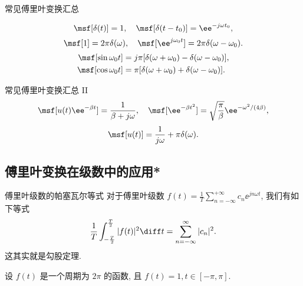 \begin{frame}{常见傅里叶变换汇总}
	\onslide<+->
	\begin{theorem*}[][常见傅里叶变换汇总 I]
	\[
		\msf[\delta(t)]=1,\quad \msf[\delta(t-t_0)]=\ee^{-j\omega t_0},
	\]
	\[
		\msf[1]=2\pi\delta(\omega),\quad \msf[\ee^{j\omega_0 t}]=2\pi\delta(\omega-\omega_0).
	\]
		\begin{align*}
		\msf[\sin \omega_0t]&=j\pi[\delta(\omega+\omega_0)-\delta(\omega-\omega_0)],\\
		\msf[\cos{\omega_0 t}]&=\pi[\delta(\omega+\omega_0)+\delta(\omega-\omega_0)].
		\end{align*}
	\end{theorem*}

	\onslide<+->
	\begin{main}{常见傅里叶变换汇总 II}
	\[
		\msf[u(t)\ee^{-\beta t}]=\dfrac1{\beta+j\omega},\quad
		\msf[\ee^{-\beta t^2}]=\sqrt{\dfrac\pi\beta}\ee^{-\omega^2/(4\beta)},
	\]
	\[
		\msf[u(t)]=\dfrac1{j\omega}+\pi\delta(\omega).
	\]
	\end{main}
\end{frame}


\subsection{傅里叶变换在级数中的应用*}
\begin{frame}{傅里叶级数的帕塞瓦尔等式\noexer}
	\onslide<+->
	对于傅里叶级数 $\displaystyle f(t)=\frac 1T\sum_{n=-\infty}^{+\infty}c_n \ee^{jn\omega t}$, 我们有如下等式
	\[\frac1{T}\int_{-\frac T2}^{\frac T2}|f(t)|^2\diff t=\sum_{n=-\infty}^{\infty}|c_n|^2.
	\]
	\onslide<+->
	这其实就是勾股定理.
	\onslide<+->
	\begin{example}
		设 $f(t)$ 是一个周期为 $2\pi$ 的函数, 且 $f(t)=1,t\in[-\pi,\pi]$.
		\bigdel
	\end{example}
\end{frame}


